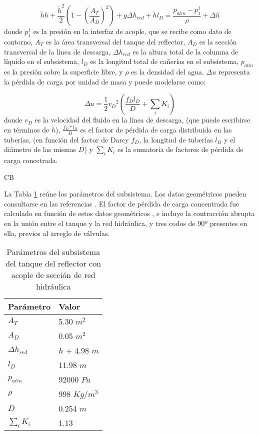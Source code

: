 \begin{equation}
\ddot{h} h + \frac{\dot{h}^2}{2}\left( 1- \left(\frac{A_T}{A_D} \right)^2 \right) + g \Delta h_{red} + \ddot{h}  l_D = 
\frac{p_{atm}-p_1^1}{\rho} + \Delta \hat{u}
\label{eq-tanque}
\end{equation}
donde $p_1^1$ es la presión en la interfaz de acople,
que se recibe como dato de contorno,
$A_T$ es la área transversal del tanque del reflector, 
$A_D$ es la sección transversal de la línea de descarga,
$\Delta h_{red}$ es la altura total de la columna de líquido en el subsistema,
$l_D$ es la longitud total de cañerías en el subsistema,
$p_{atm}$ es la presión sobre la superficie libre,
y $\rho$ es la densidad del agua.
$\Delta u$ representa la pérdida de carga por unidad de masa y puede modelarse como:

\begin{equation}
\Delta u = \frac {1} {2} {v_D}^2 \left( \frac {f_D l_D}{D} + \sum_i K_i \right)
\end{equation}
donde $v_D$ es la velocidad del fluido en la línea de descarga,
(que puede escribirse en términos de $\dot{h}$),
$\frac {f_D*l_D}{D}$ es el factor de pérdida de carga distribuida en las tuberías,
(en función del factor de Darcy $f_D$, la longitud de tuberías $l_D$ y el diámetro de las mismas $D$)
y $\sum_i K_i$ es la sumatoria de factores de pérdida de carga concetrada.

CB

La Tabla \ref{tabla-tanque} reúne los parámetros del subsistema.
Los datos geométricos pueden consultarse en las referencias \cite{invap-mockup}.
El factor de pérdida de carga concentrada fue calculado en función de estos datos geométricos \cite{iedelchik},
e incluye la contracción abrupta en la unión entre el tanque y la red hidráulica,
y tres codos de 90º presentes en ella, previos al arreglo de válvulas.

\begin{table}[]
\centering
\begin{tabular}{|l|l|}
\hline
Parámetro        & Valor          \\ \hline
$A_T$            & 5.30 $m^2$     \\ \hline
$A_D$            & 0.05 $m^2$     \\ \hline
$\Delta h_{red}$ & $h$ + 4.98 $m$ \\ \hline
$l_D$            & 11.98 $m$      \\ \hline
$p_{atm}$        & 92000 $Pa$     \\ \hline
$\rho$           & 998 $Kg/m^3$   \\ \hline
$D$              & 0.254 $m$      \\ \hline
$\sum_i K_i$     & 1.13           \\ \hline
\end{tabular}
\caption{Parámetros del subsistema del tanque del reflector con acople de sección de red hidráulica}
\label{tabla-tanque}
\end{table}

